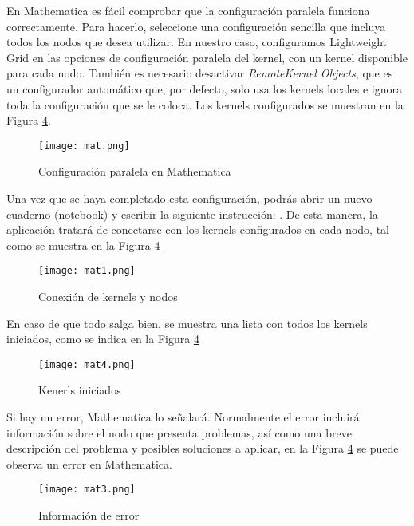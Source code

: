 \begin{spacing}{1.5}
  En Mathematica es fácil comprobar que la configuración paralela funciona
  correctamente. Para hacerlo, seleccione una configuración sencilla que
  incluya
  todos los nodos que desea utilizar. En nuestro caso, configuramos Lightweight
  Grid en las opciones de configuración paralela del kernel, con un kernel
  disponible para cada nodo. También es necesario desactivar
  \textit{RemoteKernel
    Objects}, que es un configurador automático que, por defecto, solo usa los
  kernels locales e ignora toda la configuración que se le coloca. Los kernels
  configurados se muestran en la Figura \ref{fig:etiqueta}.  \newline  \newline

  \begin{figure}[h]
    \centering
    \texttt{[image: mat.png]}
    \caption{Configuración paralela en Mathematica}
    \label{fig:etiqueta}
  \end{figure}

  Una vez que se haya completado esta configuración, podrás abrir un nuevo
  cuaderno (notebook) y escribir la siguiente instrucción: . De esta manera, la aplicación tratará de conectarse con los kernels
  configurados en cada nodo, tal como se muestra en la Figura
  \ref{fig:etiqueta}

  \begin{figure}[h]
    \centering
    \texttt{[image: mat1.png]}
    \caption{Conexión de kernels y nodos}
    \label{fig:etiqueta}
  \end{figure}

  En caso de que todo salga bien, se muestra una lista con todos los kernels
  iniciados, como se indica en la Figura \ref{fig:etiqueta}

  \begin{figure}[h]
    \centering
    \texttt{[image: mat4.png]}
    \caption{Kenerls iniciados}
    \label{fig:etiqueta}
  \end{figure}

  Si hay un error, Mathematica lo señalará. Normalmente el error incluirá
  información sobre el nodo que presenta problemas, así como una breve
  descripción del problema y posibles soluciones a aplicar, en la Figura
  \ref{fig:etiqueta} se puede observa un error en Mathematica.

  \begin{figure}[h]
    \centering
    \texttt{[image: mat3.png]}
    \caption{Información de error}
    \label{fig:etiqueta}
  \end{figure}


\end{spacing}
